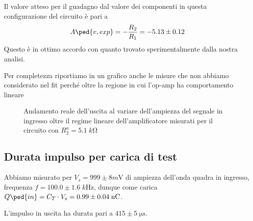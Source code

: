 \documentclass[10pt,a4paper]{article}
\begin{document}
Il valore atteso per il guadagno dal valore dei componenti in questa
configurazione del circuito è pari a
\[
A\ped{v, exp} = -\frac{R_2}{R_1} = - 5.13 \pm 0.12
\]
Questo è in ottimo accordo con quanto trovato sperimentalmente dalla nostra
analisi.

Per completezza riportiamo in un grafico anche le misure che non abbiamo
considerato nel fit perché oltre la regione in cui l'op-amp ha comportamento
lineare
\begin{figure}[htbp]
\centering
\caption{Andamento reale dell'uscita al variare dell'ampiezza del segnale in
ingresso oltre il regime lineare dell'amplificatore misurati per il circuito
con $R_2^a = 5.1 \; \si{k\ohm}$ \label{fig: gainsat}}
\end{figure}

\subsection{Durata impulso per carica di test}
Abbiamo misurato per $V_s = 999 \pm 8 \si{m\V}$ di ampiezza dell'onda quadra
in ingresso, frequenza $f = 100.0 \pm 1.6 \; \si{k\Hz}$, dunque come carica
$Q\ped{in} = C_T \cdot V_s = 0.99 \pm 0.04 \; \si{n\coulomb}$.

L'impulso in uscita ha durata pari a $415 \pm 5 \; \si{\micro\s}$.
\end{document}
